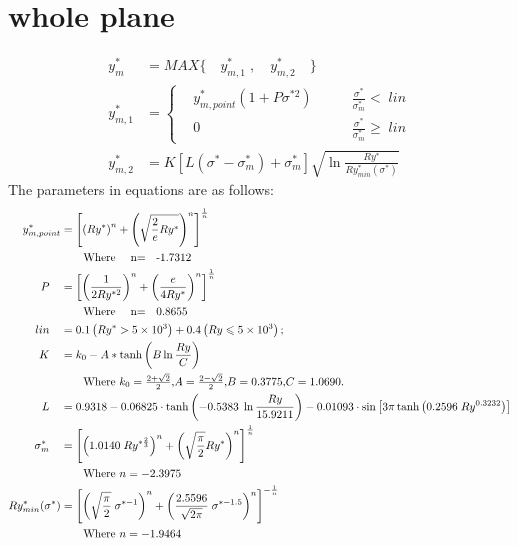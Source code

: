 \documentclass[review, 1p, number, sort&compress,table]{elsarticle}
\begin{document}
	\section{whole plane}
		\begin{align}  
		y_m^*\;  & =  MAX\{ \quad y_{m,1}^* \; , \quad  y_{m,2}^* \quad \}
			\\\nonumber
		y_{m,1}^*& =\left\{
				\begin{aligned}
					& y_{m,point}^*\left(1+P\sigma^{*2}\right)  \qquad 
					      &\frac{\sigma^*}{\sigma^*_m}   <    \;    lin\\
				    & 0   &\frac{\sigma^*}{\sigma^*_m}   \geq \;    lin
				\end{aligned}
				\right.
			\\ \nonumber
		y_{m,2}^*& = K\left[L\left(\sigma^*-\sigma^{*}_m\right)+\sigma^{*}_m 	\right]\sqrt{\ln{\frac{Ry^{*}}{Ry_{min}^{*}(\sigma^{*})}}}
		\end{align} 
		The parameters in equations are as follows:
		\begin{align}
		\nonumber
			y_{m,point}^* &=\left[\left(Ry^*\right)^n+  \left( \sqrt{\frac{2}{e}Ry^{*}}\right)^n  \right]^{\frac{1}{n}}    
			\\ \nonumber &\quad \quad \mbox{\mbox{Where}  \quad  n= \; -1.7312}
			\\ \nonumber
			P \quad      & =\left[\left( \frac{1}{2Ry^{*2}}\right)^n+  \left( \frac{e}{4Ry^{*}}\right)^n  \right]^{\frac{1}{n}}    
			\\ \nonumber &\quad \quad \mbox{\mbox{Where}  \quad  n= \; 0.8655}
			\\  \nonumber 
			lin \quad      & =0.1\left(Ry^*>5\times10^3\right)+0.4\left(Ry\leqslant5\times10^3\right);   
			\\ \nonumber
			K \quad      &=k_0-A*\tanh{\left(B\ln{\frac{Ry}{C}}\right)}
			\\ \nonumber & \quad \quad \mbox{Where $k_0=\frac{2+\sqrt{2}}{2}$,$A=\frac{2-\sqrt{2}}{2}$,$B=0.3775$,$C=1.0690$.} 
			\\ \nonumber
			L \quad     &= 
			0.9318-0.06825\cdot\tanh\left({-0.5383\; \ln{\frac{Ry}{15.9211}}}\right) -0.01093 \cdot \sin\left[{3\pi \tanh\left({0.2596\; Ry^{0.3232}} \right)}\right]
			\\ \nonumber
			\sigma^{*}_{m}\quad & =\left[ \left( 1.0140 \; Ry^{*\frac{2}{3}}\right)^n+ \left( \sqrt{\frac{\pi}{2}}Ry^{*}\right)^n\right]^\frac{1}{n}
			\\ \nonumber & \quad \quad\mbox{Where $n=-2.3975$}				
			\\ \nonumber
			Ry_{min}^{*}(\sigma^{*})& = \left[ \left( \sqrt{\frac{\pi}{2}}    \; \sigma^{*-1}\right)^n+ \left(\frac{2.5596}{\sqrt{2\pi}} \; \sigma^{*-1.5}\right)^n\right]^{-\frac{1}{n}}	
			\\ \nonumber
				       & \quad \quad \mbox{Where $n=-1.9464$}
		\end{align}
\end{document}
